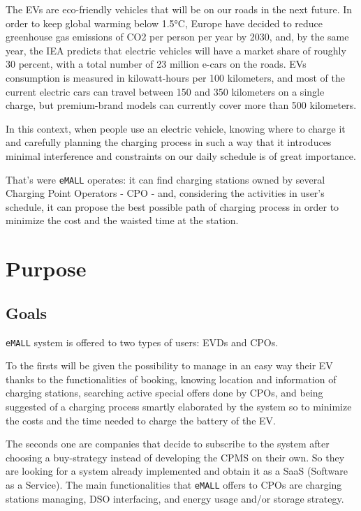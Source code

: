 The EVs are eco-friendly vehicles that will be on our roads in the next future.
In order to keep global warming below 1.5°C, Europe have decided to reduce greenhouse gas emissions of CO2 per
person per year by 2030, and, by the same year, the IEA predicts that electric vehicles will have a market share
of roughly 30 percent, with a total number of 23 million e-cars on the roads.
EVs consumption is measured in kilowatt-hours per 100 kilometers, and most of the current electric cars can travel
between 150 and 350 kilometers on a single charge, but premium-brand models can currently cover more than 500
kilometers.

In this context, when people use an electric vehicle, knowing where to charge it and carefully planning the
charging process in such a way that it introduces minimal interference and constraints on our daily schedule
is of great importance.

That's were \verb|eMALL| operates: it can find charging stations owned by several Charging Point Operators - CPO - and,
considering the activities in user's schedule, it can propose the best possible path of charging process
in order to minimize the cost and the waisted time at the station.
\newpage


\section{Purpose}
\label{sec:purpose}
\setcounter{g}{1}
\newcommand{\cg}{\theg\stepcounter{g}}

\subsection{Goals}
\verb|eMALL| system is offered to two types of users: EVDs and CPOs.

To the firsts will be given the possibility to manage in an easy way their EV thanks to the functionalities of booking,
knowing location and information of charging stations, searching active special offers done by CPOs, and being suggested
of a charging process smartly elaborated by the system so to minimize the costs and the time needed to charge the battery
of the EV.

The seconds one are companies that decide to subscribe to the system after choosing a buy-strategy instead of developing
the CPMS on their own.
So they are looking for a system already implemented and obtain it as a SaaS (Software as a Service).
The main functionalities that \verb|eMALL| offers to CPOs are charging stations managing, DSO interfacing, and energy
usage and/or storage strategy.

